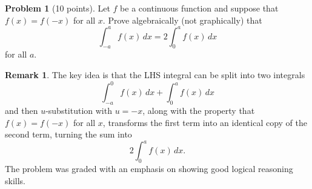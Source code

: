 \documentclass[11pt,oneside]{amsart}
\theoremstyle{definition}
\newtheorem{problem}{Problem}
\newtheorem*{remark}{Remark}
\begin{document}
\newpage

\begin{problem}[10 points]
Let $f$ be a continuous function and suppose that $f(x)=f(-x)$ for all $x$. Prove algebraically (not graphically) that
\[\int_{-a}^a f(x)\,dx=2\int_0^a f(x)\,dx\]
for all $a$.
\end{problem}
\begin{remark}
  The key idea is that the LHS integral can be split into two integrals
  \[\int_{-a}^0 f(x)\,dx+\int_0^a f(x)\,dx\]
  and then $u$-substitution with $u=-x$, along with the property that $f(x)=f(-x)$ for all $x$, transforms the first term into an identical copy of the second term, turning the sum into
  \[2\int_0^a f(x)\,dx.\]
  The problem was graded with an emphasis on showing good logical reasoning skills.
\end{remark}
\end{document}
